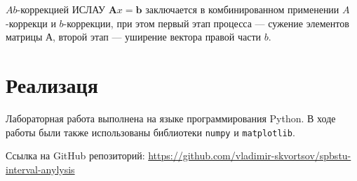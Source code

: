 \documentclass{article}
\begin{document}
  \( Ab \)-коррекцией ИСЛАУ \( \mathbf{A}x = \mathbf{b} \) заключается
  в комбинированном применении \( A \)-коррекци и \( b \)-коррекции,
  при этом первый этап процесса --- сужение элементов матрицы А,
  второй этап --- уширение вектора правой части \( b \).

  \section{Реализаця}

  Лабораторная работа выполнена на языке программирования Python. В ходе
  работы были также использованы библиотеки \verb!numpy! и
  \verb!matplotlib!.

  Ссылка на GitHub репозиторий:
  \href{https://github.com/vladimir-skvortsov/spbstu-interval-anylysis}{https://github.com/vladimir-skvortsov/spbstu-interval-anylysis}




\end{document}
